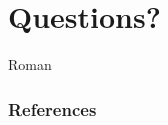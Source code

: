 \documentclass[11pt]{beamer}
\begin{document}
    \section{Questions?}
    

    \begin{frame}[t,allowframebreaks]{Roman}
        \frametitle{References}
        \printbibliography
    \end{frame}
\end{document}
